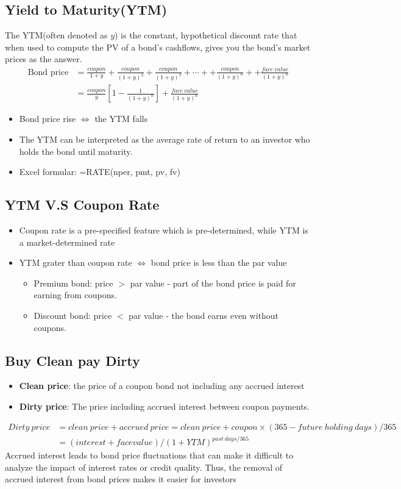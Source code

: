 \documentclass{article}
\theoremstyle{definition}
\theoremstyle{thrm}
\theoremstyle{lma}
\theoremstyle{ppst}
\theoremstyle{crlr}
\begin{document}
\subsection{Yield to Maturity(YTM)}
The YTM(often denoted as $y$) is the constant, hypothetical discount rate that when used to compute the PV of a bond's cashflows, gives you the bond's market prices as the answer. 
\begin{align*}
	\text{Bond price} &= \frac{coupon}{1+y} + \frac{coupon}{(1+y)^2} + \frac{coupon}{(1+y)^3} +\cdots ++ \frac{coupon}{(1+y)^n} ++ \frac{face \ value}{(1+y)^n}\\
	&= \frac{coupon}{y}[1-\frac{1}{(1+y)^n}]+\frac{face\ value }{(1+y)^n}
\end{align*}
\begin{itemize}
	\item Bond price rise $\iff$ the YTM falls
	\item The YTM can be interpreted as the average rate of return to an investor who holds the bond until maturity.
	\item Excel formular: =RATE(nper, pmt, pv, fv)
\end{itemize}
\subsection{YTM V.S Coupon Rate}
\begin{itemize}
	\item Coupon rate is a pre-specified feature which is pre-determined, while YTM is a market-determined rate
	\item YTM grater than coupon rate $\iff$ bond price is less than the par value
	\begin{itemize}
		\item Premium bond: price $>$ par value - part of the bond price is paid for earning from coupons. 
		\item Discount bond: price $<$ par value - the bond earns even without coupons.
	\end{itemize}
\end{itemize}
\subsection{Buy Clean pay Dirty}
\begin{itemize}
	\item \textbf{Clean price}: the price of a coupon bond not including any accrued interest
	\item \textbf{Dirty price}: The price including accrued interest between coupon payments. 
\end{itemize}
\begin{align*}
	Dirty \ price &= clean \ price + accrued \ price = clean\ price + coupon \times (365- future\ holding \ days)/365\\
	&= (interest + face value)/(1+YTM)^{past\ days/365}
\end{align*}
Accrued interest leads to bond price fluctuations that can make it difficult to analyze the impact of interest rates or credit quality. Thus, the removal of accrued interest from bond prices makes it easier for investors
\end{document}
